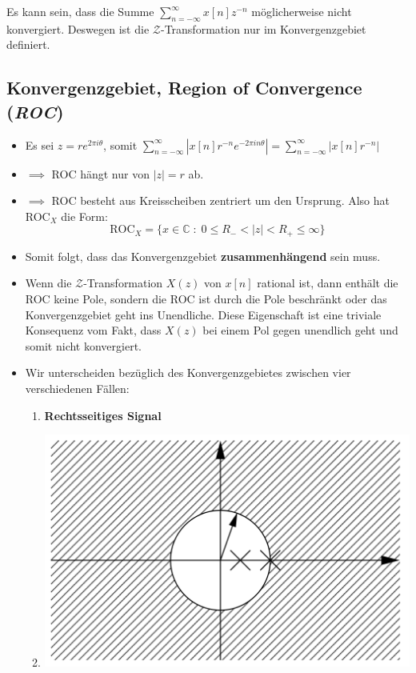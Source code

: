 \documentclass[11pt]{article}
\begin{document}
Es kann sein, dass die Summe $\sum_{n=-\infty}^\infty x[n]z^{-n}$ möglicherweise nicht konvergiert. Deswegen ist die $\mathcal{Z}$-Transformation nur im Konvergenzgebiet definiert.

\subsection*{Konvergenzgebiet, Region of Convergence (\textit{ROC})}
\vspace*{-0.5cm}
%
\begin{itemize}[leftmargin = 0pt]
    \item[] Es sei $z= re^{2\pi i \theta}$, somit $\displaystyle\sum_{n=-\infty}^\infty \left| x[n]r^{-n}e^{-2\pi i n \theta} \right| = \displaystyle\sum_{n=-\infty}^\infty \left| x[n]r^{-n} \right|$
    \item[] $\implies$ ROC hängt nur von $|z|=r$ ab.
    \item[] $\implies$ ROC besteht aus Kreisscheiben zentriert um den Ursprung. Also hat ROC$_X$ die Form:
    $$\text{ROC}_X = \{x \in \mathbb{C} \; : \; 0 \leq R_- < |z| < R_+ \leq \infty\}$$
    \item[] Somit folgt, dass das Konvergenzgebiet \textbf{zusammenhängend} sein muss.
    \item[] Wenn die $\mathcal{Z}$-Transformation $X(z)$ von $x[n]$ rational ist, dann enthält die ROC keine Pole, sondern die ROC ist durch die Pole beschränkt oder das Konvergenzgebiet geht ins Unendliche. Diese Eigenschaft ist eine triviale Konsequenz vom Fakt, dass $X(z)$ bei einem Pol gegen unendlich geht und somit nicht konvergiert.
    \item[] Wir unterscheiden bezüglich des Konvergenzgebietes zwischen vier verschiedenen Fällen:
    \begin{enumerate}
        \item \textbf{Rechtsseitiges Signal}
        \item[] \begin{center}
            \includegraphics[width=0.4\linewidth]{docimgs/Rechtsseitig.png}

\end{center}
\end{enumerate}
\end{itemize}
\end{document}
